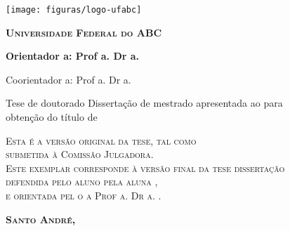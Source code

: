 \thispagestyle{empty}
\texttt{[image: figuras/logo-ufabc]} \hfill

\vspace{1.37cm}
\begin{center}
  {\large \scshape \bfseries Universidade Federal do ABC
  \vspace{.5cm}

\centro}
\end{center}
\vspace{.7cm}
\begin{center}
  {\large \scshape \bfseries \autor}
\end{center}
\vspace{.7cm}
\begin{center}
  {\LARGE \scshape \bfseries \titulo}
\end{center}
\vspace{1cm}
{\bfseries
\noindent
Orientador\ifx\femaleOrientador\undefined
\else
a\fi: Prof\ifx\femaleOrientador\undefined
\else
a\fi. Dr\ifx\femaleOrientador\undefined
\else
a\fi. \orientador
\vspace{.25cm}

\ifx\coorientador\undefined
\else
\noindent
Coorientador\ifx\femaleCoorientador\undefined
\else
a\fi: Prof\ifx\femaleCoorientador\undefined
\else
a\fi. Dr\ifx\femaleCoorientador\undefined
\else
a\fi. \coorientador
\fi
}

\vspace{1.4cm}
\begin{flushright}
  \begin{minipage}[c]{.6\textwidth}
    \begin{flushleft}
      \ifx\mestrado\undefined
      \noindent Tese de doutorado
      \else
    \noindent   Dissertação de mestrado
      \fi
      apresentada ao \centro para \\ \noindent  obtenção do título de
      \titulacao
    \end{flushleft}
  \end{minipage}
\end{flushright}
\vspace{1.3cm}
  \ifx\versaofinal\undefined
\noindent 
{\footnotesize \scshape
Esta é a versão original da tese, tal como\\
submetida à Comissão Julgadora.\\
}
\else
\noindent 
{\footnotesize \scshape
Este exemplar corresponde à versão final da 
\ifx\mestrado\undefined
tese
\else
dissertação
\fi \\
defendida 
\ifx\femaleAuthor\undefined
pelo aluno 
\else
pela aluna
\fi
\autor,\\
e orientada pel\ifx\femaleOrientador\undefined
o\else
a\fi{} Prof\ifx\femaleOrientador\undefined
\else
a\fi. Dr\ifx\femaleOrientador\undefined
\else
a\fi. \orientador.
}
\fi



\vspace{1.2cm}


\vfill
\begin{center}
  {\small \scshape \bfseries Santo André, \ano}
\end{center}
